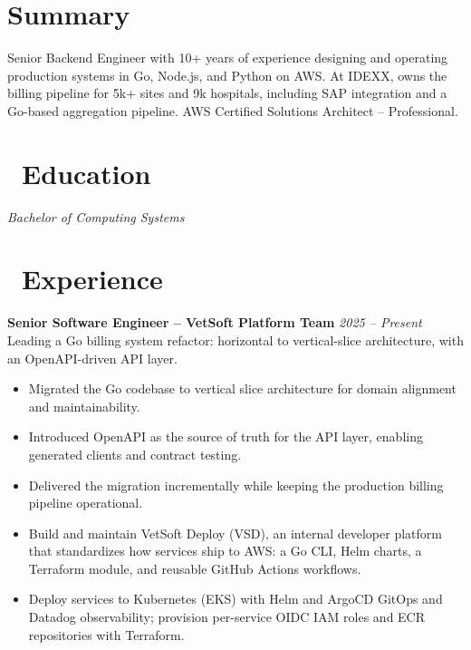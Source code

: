 \documentclass{resume}
\begin{document}


  \vspace{2em}

\section*{Summary}
Senior Backend Engineer with 10+ years of experience designing and operating production systems in Go, Node.js, and Python on AWS. At IDEXX, owns the billing pipeline for 5k+ sites and 9k hospitals, including SAP integration and a Go-based aggregation pipeline. AWS Certified Solutions Architect – Professional.

\section{\faGraduationCap\ Education}
\textit{Bachelor of Computing Systems}


\section{\faUsers\ Experience}
\vspace{1em}
\textbf{Senior Software Engineer – VetSoft Platform Team} \hfill \textit{2025 -- Present} \\
Leading a Go billing system refactor: horizontal to vertical-slice architecture, with an OpenAPI-driven API layer.
\begin{itemize}
  \item Migrated the Go codebase to vertical slice architecture for domain alignment and maintainability.
  \item Introduced OpenAPI as the source of truth for the API layer, enabling generated clients and contract testing.
  \item Delivered the migration incrementally while keeping the production billing pipeline operational.
  \item Build and maintain VetSoft Deploy (VSD), an internal developer platform that standardizes how services ship to AWS: a Go CLI, Helm charts, a Terraform module, and reusable GitHub Actions workflows.
  \item Deploy services to Kubernetes (EKS) with Helm and ArgoCD GitOps and Datadog observability; provision per-service OIDC IAM roles and ECR repositories with Terraform.
\end{itemize}
\end{document}
